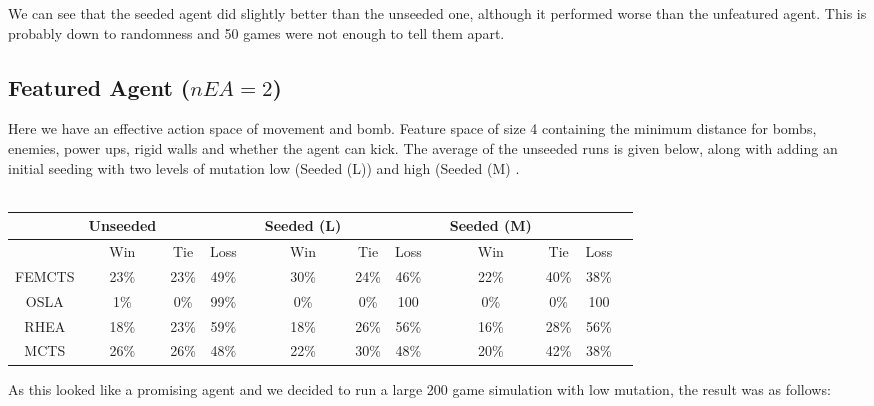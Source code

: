 \documentclass{llncs}
\begin{document}
\vspace{3mm}

\noindent
We can see that the seeded agent did slightly better than the unseeded one, although it performed worse than the unfeatured agent. This is probably down to randomness and 50 games were not enough to tell them apart.

\subsection{Featured Agent ($nEA = 2$)}

Here we have an effective action space of movement and bomb. Feature space of size 4 containing the minimum distance for bombs, enemies, power ups, rigid walls and whether the agent can kick. The average of the unseeded runs is given below, along with adding an initial seeding with two levels of mutation low (Seeded (L)) and high (Seeded (M) . \\ \\

\noindent
\begin{center}
\begin{tabular}{ |c|c|c|c|c|c|c|c|c|c|c|c|c| } 
 \hline
 &Unseeded  & & & & Seeded (L)& & & &Seeded (M) & & \\
 \hline
  	        & Win &	Tie & Loss & & Win &	Tie & Loss & & Win &	Tie & Loss \\ 
  \hline
  FEMCTS	   &23\%	&23\%	&49\% &     &30\%	&24\%	&46\% & 	&22\%	&40\%	&38\% \\
  OSLA     &1\%     &0\%	&99\% &     &0\%    &0\%	&100  &     &0\%    &0\%	&100 \\
  RHEA     &18\%    &23\%	&59\% &     &18\%   &26\%	&56\% &     &16\%   &28\%	&56\% \\
  MCTS     &26\%	& 26\%	&48\% &    &22\%	&30\%	&48\% &     &20\%	& 42\%	&38\% \\
 \hline
\end{tabular}
\label{sophisticatedtable}
\end{center} 




\vspace{3mm}

\noindent
As this looked like a promising agent and we decided to run a large 200 game simulation with low mutation, the result was as follows:
\end{document}
